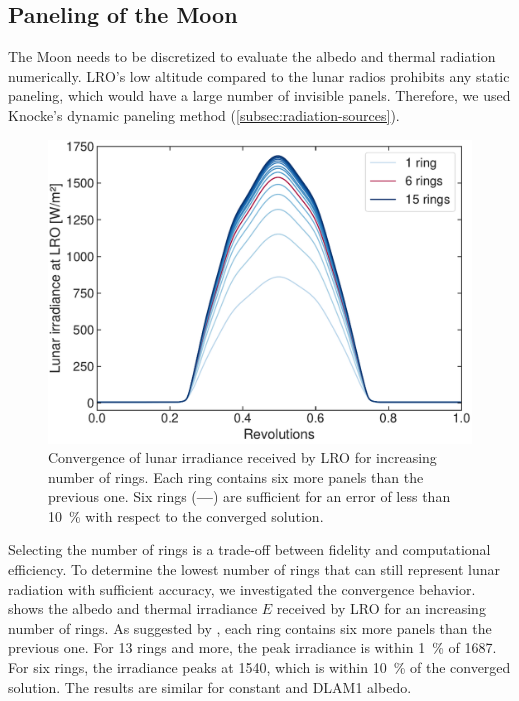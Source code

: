 \subsection{Paneling of the Moon}

The Moon needs to be discretized to evaluate the albedo and thermal radiation numerically. \gls{LRO}'s low altitude compared to the lunar radios prohibits any static paneling, which would have a large number of invisible panels. Therefore, we used Knocke's dynamic paneling method (\cref{subsec:radiation-sources}).

\begin{figure}[t]
    \centering
    \includegraphics[width=\linewidth]{figures/plots/paneling_convergence.pdf}
    \caption{Convergence of lunar irradiance received by \gls{LRO} for increasing number of rings. Each ring contains six more panels than the previous one. Six rings (\textcolor{mpl-red}{\textbf{---}}) are sufficient for an error of less than \qty{10}{\percent} with respect to the converged solution.}
    \label{fig:paneling-convergence}
\end{figure}

Selecting the number of rings is a trade-off between fidelity and computational efficiency. To determine the lowest number of rings that can still represent lunar radiation with sufficient accuracy, we investigated the convergence behavior.  shows the albedo and thermal irradiance $E$ received by \gls{LRO} for an increasing number of rings. As suggested by \citeauthor{Knocke1988}, each ring contains six more panels than the previous one. For 13 rings and more, the peak irradiance is within \qty{1}{\percent} of \qty{1687}{\irr}. For six rings, the irradiance peaks at \qty{1540}{\irr}, which is within \qty{10}{\percent} of the converged solution. The results are similar for constant and \gls{DLAM1} albedo.

